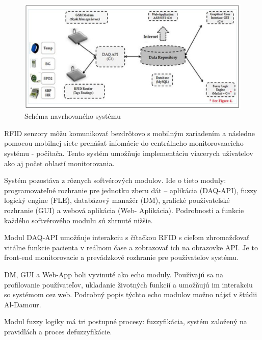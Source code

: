 \begin{figure}[h]
\includegraphics[scale=0.5]{scheme-fuzzy.png}
\caption{Schéma navrhovaného systému \cite{2019}}
\end{figure}

RFID senzory môžu komunikovať bezdrôtovo s mobilným zariadením a následne pomocou mobilnej siete prenášať infomácie do centrálneho monitorovaacieho systému - počítača. Tento systém umožňuje implementáciu viacerych užívateľov ako aj počet oblastí monitorovania. \cite{2019} 

Systém pozostáva z rôznych softvérových modulov. Ide o tieto moduly: programovateľné rozhranie pre jednotku zberu dát – aplikácia (DAQ-API), fuzzy logický engine (FLE), databázový manažér (DM), grafické používateľské rozhranie (GUI) a webová aplikácia (Web- Aplikácia). Podrobnosti a funkcie každého softvérového modulu sú zhrnuté nižšie. \cite{2019}

Modul DAQ-API umožňuje interakciu s čítačkou RFID s cieľom zhromažďovať vitálne funkcie pacienta v reálnom čase a zobrazovať ich na obrazovke API. Je to front-end monitorovacie a prevádzkové rozhranie pre používateľov systému.\cite{2019}

DM, GUI a Web-App boli vyvinuté ako echo moduly. Používajú sa na profilovanie používateľov, ukladanie životných funkcií a umožňujú im interakciu so systémom cez web. Podrobný popis týchto echo modulov možno nájsť v štúdii Al-Damour\cite{2013}.\cite{2019}

Modul fuzzy logiky má tri postupné procesy: fuzzyfikácia, systém založený na pravidlách a proces defuzzyfikácie.\cite{2019}

